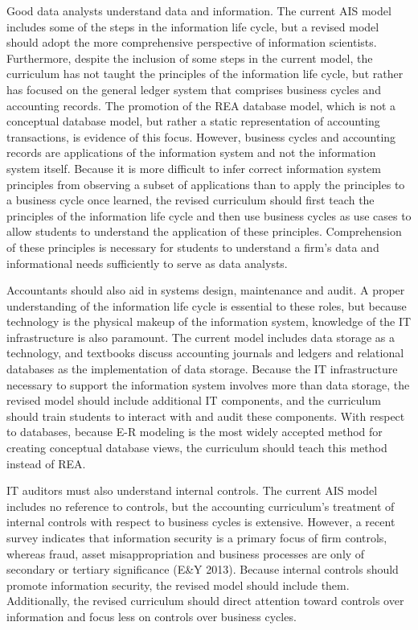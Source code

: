 \documentclass[12pt]{article}
\begin{document}
Good data analysts understand data and information. The current AIS model includes some of the steps in the information life cycle, but a revised model should adopt the more comprehensive perspective of information scientists. Furthermore, despite the inclusion of some steps in the current model, the curriculum has not taught the principles of the information life cycle, but rather has focused on the general ledger system that comprises business cycles and accounting records. The promotion of the REA database model, which is not a conceptual database model, but rather a static representation of accounting transactions, is evidence of this focus. However, business cycles and accounting records are applications of the information system and not the information system itself. Because it is more difficult to infer correct information system principles from observing a subset of applications than to apply the principles to a business cycle once learned, the revised curriculum should first teach the principles of the information life cycle and then use business cycles as use cases to allow students to understand the application of these principles. Comprehension of these principles is necessary for students to understand a firm's data and informational needs sufficiently to serve as data analysts.

Accountants should also aid in systems design, maintenance and audit. A proper understanding of the information life cycle is essential to these roles, but because technology is the physical makeup of the information system, knowledge of the IT infrastructure is also paramount. The current model includes data storage as a technology, and textbooks discuss accounting journals and ledgers and relational databases as the implementation of data storage. Because the IT infrastructure necessary to support the information system involves more than data storage, the revised model should include additional IT components, and the curriculum should train students to interact with and audit these components. With respect to databases, because E-R modeling is the most widely accepted method for creating conceptual database views, the curriculum should teach this method instead of REA.

IT auditors must also understand internal controls. The current AIS model includes no reference to controls, but the accounting curriculum's treatment of internal controls with respect to business cycles is extensive. However, a recent survey indicates that information security is a primary focus of firm controls, whereas fraud, asset misappropriation and business processes are only of secondary or tertiary significance (E\&Y 2013). Because internal controls should promote information security, the revised model should include them. Additionally, the revised curriculum should direct attention toward controls over information and focus less on controls over business cycles.
\end{document}
